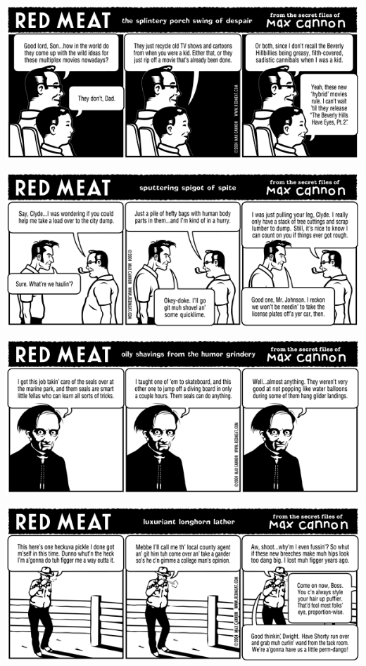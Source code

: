 \documentclass[a4paper,twoside,11pt]{article}
\begin{document}
\includegraphics[width=\textwidth]{redmeat_2004-01-20.png}



\includegraphics[width=\textwidth]{redmeat_2004-01-27.png}



\includegraphics[width=\textwidth]{redmeat_2004-02-03.png}



\includegraphics[width=\textwidth]{redmeat_2004-02-10.png}
\end{document}
